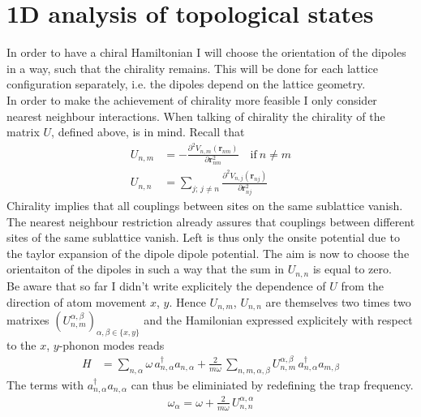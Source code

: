 
\section*{1D analysis of topological states}
In order to have a chiral Hamiltonian I will choose the orientation of the dipoles in a way, such that the chirality remains. This will be done for each lattice configuration separately, i.e. the dipoles depend on the lattice geometry.\\
In order to make the achievement of chirality more feasible I only consider nearest neighbour interactions. When talking of chirality the chirality of the matrix $U$, defined above, is in mind. Recall that
\begin{align*}
    U_{n,m}&=
        -\frac{\partial^2 V_{n,m}(\mathbf{r}_{nm})}{\partial\mathbf{r}_{nm}^2}\quad\text{if}\:n\neq m\\
    U_{n,n} &= \sum_{j;\,j\neq n}\frac{\partial^2 V_{n,j}(\mathbf{r}_{nj})}{\partial\mathbf{r}_{nj}^2}
\end{align*}
Chirality implies that all couplings between sites on the same sublattice vanish. The nearest neighbour restriction already assures that couplings between different sites of the same sublattice vanish. Left is thus only the onsite potential due to the taylor expansion of the dipole dipole potential. The aim is now to choose the orientaiton of the dipoles in such a way that the sum in $U_{n,n}$ is equal to zero.\\ Be aware that so far I didn't write explicitely the dependence of $U$ from the direction of atom movement $x$, $y$. Hence $U_{n,m}$, $U_{n,n}$ are themselves two times two matrixes $(U_{n,m}^{\alpha,\beta})_{\alpha,\beta\in\{x,y\}}$ and the Hamilonian expressed explicitely with respect to the $x$, $y$-phonon modes reads
\begin{align*}
    H &= \sum_{n,\alpha} \omega\,a_{n,\alpha}^\dagger a_{n,\alpha} +\frac{2}{m\omega}\, \sum_{n,m,\alpha,\beta} U^{\alpha,\beta}_{n,m}\,a_{n,\alpha}^\dagger a_{m,\beta}    
\end{align*}
The terms with $a_{n,\alpha}^\dagger a_{n,\alpha}$ can thus be eliminiated by redefining the trap frequency.
\begin{align*}
    \omega_\alpha=\omega+\frac{2}{m\omega}\,U^{\alpha,\alpha}_{n,n}
\end{align*}

